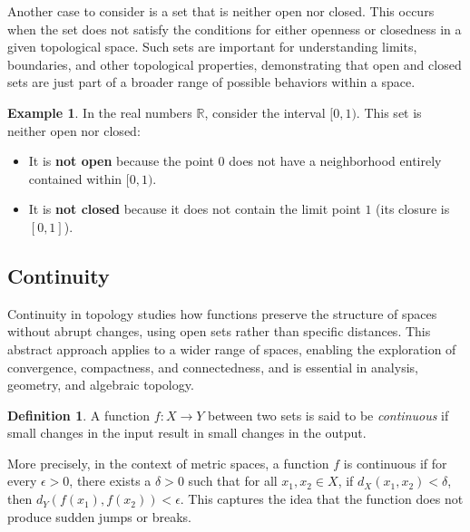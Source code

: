 \documentclass[12pt, reqno]{amsart}
\theoremstyle{definition}
\newtheorem{definition}[theorem]{Definition}
\newtheorem{example}[theorem]{Example}
\numberwithin{equation}{section}
\newcommand{\dR}{{\mathbb R}}
\begin{document}
Another case to consider is a set that is neither open nor closed. This occurs when the set does not satisfy the conditions for either openness or closedness in a given topological space. Such sets are important for understanding limits, boundaries, and other topological properties, demonstrating that open and closed sets are just part of a broader range of possible behaviors within a space.
\pagebreak
\begin{example}
In the real numbers $\dR$, consider the interval $[0, 1)$. This set is neither open nor closed:
\begin{itemize}
    \item It is \textbf{not open} because the point $0$ does not have a neighborhood entirely contained within $[0, 1)$.
    \item It is \textbf{not closed} because it does not contain the limit point $1$ (its closure is $[0, 1]$).
\end{itemize}
\end{example}
\begin{comment}
    Open Graph Theorem and Closed Graph Theorem are two important results of these definitions in Linear Topological Space, which we discuss in the next section. They illustrate how openness and closedness govern the behavior of mappings in topological and functional analytic contexts.

\end{comment}


\subsection{Continuity}
Continuity in topology studies how functions preserve the structure of spaces without abrupt changes, using open sets rather than specific distances. This abstract approach applies to a wider range of spaces, enabling the exploration of convergence, compactness, and connectedness, and is essential in analysis, geometry, and algebraic topology.

\begin{definition}
    A function $f: X \to Y$ between two sets is said to be \emph{continuous} if small changes in the input result in small changes in the output. 
    
    More precisely, in the context of metric spaces, a function $f$ is continuous if for every $\epsilon > 0$, there exists a $\delta > 0$ such that for all $x_1, x_2 \in X$, if $d_X(x_1, x_2) < \delta$, then $d_Y(f(x_1), f(x_2)) < \epsilon$. This captures the idea that the function does not produce sudden jumps or breaks.
\end{definition}
\end{document}

